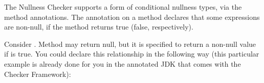 %



The Nullness Checker supports a form of conditional nullness types, via the
 method annotations.
The annotation on a method declares that some expressions are non-null, if
the method returns true (false, respectively).

Consider .
Method
may return null, but it is specified to return a non-null value if
 is
true.
You could declare this relationship in the following way (this particular
example is already
done for you in the annotated JDK that comes with the Checker Framework):

